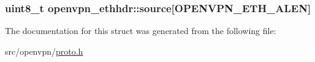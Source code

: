 \subsubsection[{source}]{\setlength{\rightskip}{0pt plus 5cm}uint8\+\_\+t openvpn\+\_\+ethhdr\+::source\mbox{[}{\bf O\+P\+E\+N\+V\+P\+N\+\_\+\+E\+T\+H\+\_\+\+A\+L\+E\+N}\mbox{]}}\label{structopenvpn__ethhdr_aff8e5e6757fd80a747923c1e3da09898}


The documentation for this struct was generated from the following file\+:\begin{DoxyCompactItemize}
\item 
src/openvpn/\hyperlink{proto_8h}{proto.\+h}\end{DoxyCompactItemize}

